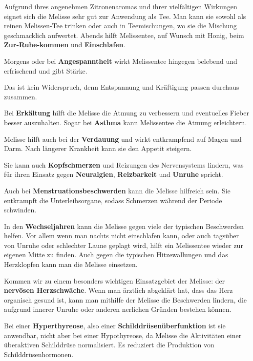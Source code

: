 Aufgrund ihres angenehmen Zitronenaromas und ihrer vielfältigen Wirkungen eignet sich die Melisse sehr gut zur Anwendung als Tee. Man kann sie sowohl als reinen Melissen-Tee trinken oder auch in Teemischungen, wo sie die Mischung geschmacklich aufwertet.
Abends hilft Melissentee, auf Wunsch mit Honig, beim \textbf{Zur-Ruhe-kommen} und \textbf{Einschlafen}.

Morgens oder bei \textbf{Angespanntheit} wirkt Melissentee hingegen belebend und erfrischend und gibt Stärke.

Das ist kein Widerspruch, denn Entspannung und Kräftigung passen durchaus zusammen.

Bei \textbf{Erkältung} hilft die Melisse die Atmung zu verbessern und eventuelles Fieber besser auszuhalten. Sogar bei \textbf{Asthma} kann Melissentee die Atmung erleichtern.

Melisse hilft auch bei der \textbf{Verdauung} und wirkt entkrampfend auf Magen und Darm. Nach längerer Krankheit kann sie den Appetit steigern.

Sie kann auch \textbf{Kopfschmerzen} und Reizungen des Nervensystems lindern, was für ihren Einsatz gegen \textbf{Neuralgien}, \textbf{Reizbarkeit} und \textbf{Unruhe} spricht.

Auch bei \textbf{Menstruationsbeschwerden} kann die Melisse hilfreich sein. Sie entkrampft die Unterleibsorgane, sodass Schmerzen während der Periode schwinden.

In den \textbf{Wechseljahren} kann die Melisse gegen viele der typischen Beschwerden helfen. Vor allem wenn man nachts nicht einschlafen kann, oder auch tagsüber von Unruhe oder schlechter Laune geplagt wird, hilft ein Melissentee wieder zur eigenen Mitte zu finden. Auch gegen die typischen Hitzewallungen und das Herzklopfen kann man die Melisse einsetzen.

Kommen wir zu einem besonders wichtigen Einsatzgebiet der Melisse: der \textbf{nervösen Herzschwäche}. Wenn man ärztlich abgeklärt hat, dass das Herz organisch gesund ist, kann man mithilfe der Melisse die Beschwerden lindern, die aufgrund innerer Unruhe oder anderen nerlichen Gründen bestehen können.

Bei einer \textbf{Hyperthyreose}, also einer \textbf{Schilddrüsenüberfunktion} ist sie anwendbar, nicht aber bei einer Hypothyreose, da Melisse die Aktivitäten einer überaktiven Schilddrüse normalisiert. Es reduziert die Produktion von Schilddrüsenhormonen.


